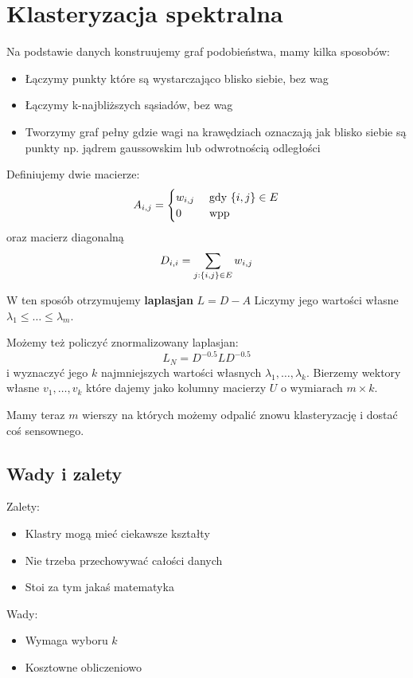 \section{Klasteryzacja spektralna}

Na podstawie danych konstruujemy graf podobieństwa, mamy kilka sposobów:
\begin{itemize}
    \item Łączymy punkty które są wystarczająco blisko siebie, bez wag
    \item Łączymy k-najbliższych sąsiadów, bez wag
    \item Tworzymy graf pełny gdzie wagi na krawędziach oznaczają jak blisko siebie są punkty np. jądrem gaussowskim lub odwrotnością odległości
\end{itemize}

Definiujemy dwie macierze:
\[
    A_{i, j} = \begin{cases}
    w_{i, j} & \text{ gdy } \set{i, j} \in E \\
    0 & \text{ wpp }
    \end{cases}
\]
oraz macierz diagonalną
\[
    D_{i, i} = \sum_{j : \set{i, j} \in E} w_{i, j}
\]

W ten sposób otrzymujemy \textbf{laplasjan} \( L = D - A \)
Liczymy jego wartości własne \( \lambda_1 \leq \dots \leq \lambda_m \).

Możemy też policzyć znormalizowany laplasjan:
\[
    L_N = D^{-0.5}LD^{-0.5}
\]
i wyznaczyć jego \( k \) najmniejszych wartości własnych \( \lambda_1, \dots, \lambda_k \).
Bierzemy wektory własne \( v_1, \dots, v_k \) które dajemy jako kolumny macierzy \( U \) o wymiarach \( m \times k \).

Mamy teraz \( m \) wierszy na których możemy odpalić znowu klasteryzację i dostać coś sensownego.

\subsection{Wady i zalety}
Zalety:
\begin{itemize}
    \item Klastry mogą mieć ciekawsze kształty
    \item Nie trzeba przechowywać całości danych
    \item Stoi za tym jakaś matematyka
\end{itemize}

Wady:
\begin{itemize}
    \item Wymaga wyboru \( k \)
    \item Kosztowne obliczeniowo
\end{itemize}